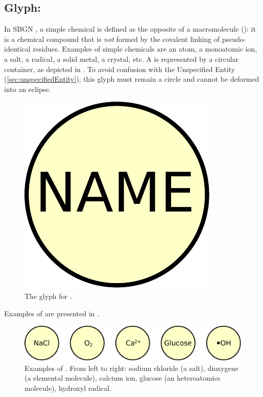 
\subsection{Glyph: }
\label{sec:simpleChemical}

In SBGN \PDs, a simple chemical is defined as the opposite of a macromolecule (): it is a chemical compound that is \emph{not} formed by the covalent linking of pseudo-identical residues.  Examples of simple chemicals are an atom, a monoatomic ion, a salt, a radical, a solid metal, a crystal, etc. A  is represented by a circular
container, as depicted in . To avoid confusion with the Unspecified Entity (\ref{sec:unspecifiedEntity}), this glyph must remain a circle and cannot be deformed into an eclipse.

\begin{figure}[H]
  \centering
  \includegraphics[scale = 0.3]{images/simpleChemical}
  \caption{The \PD glyph for .}
  \label{fig:simpleChemical}
\end{figure}

Examples of  are presented in .

\begin{figure}[H]
  \centering
  \includegraphics[scale = 0.5]{images/simpleChemical-examples}
  \caption{Examples of . From left to right: sodium chloride (a salt), dioxygene (a elemental molecule), calcium ion, glucose (an heteroatomics molecule), hydroxyl radical.}
  \label{fig:simpleChemical-examples}
\end{figure}
